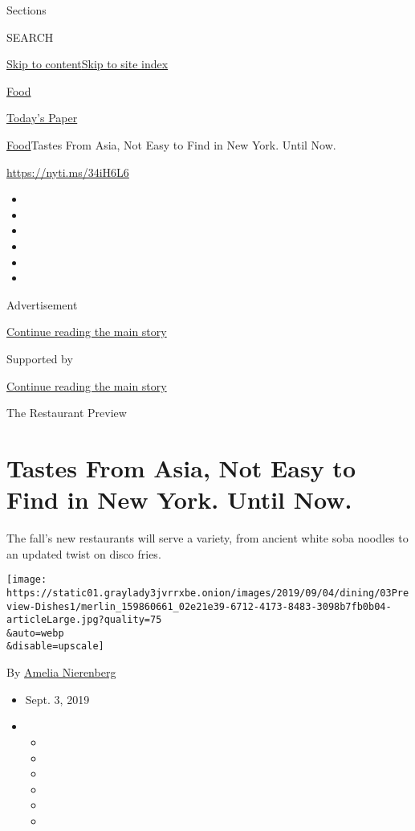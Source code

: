 Sections

SEARCH

\protect\hyperlink{site-content}{Skip to
content}\protect\hyperlink{site-index}{Skip to site index}

\href{https://www.nytimes3xbfgragh.onion/section/food}{Food}

\href{https://myaccount.nytimes3xbfgragh.onion/auth/login?response_type=cookie\&client_id=vi}{}

\href{https://www.nytimes3xbfgragh.onion/section/todayspaper}{Today's
Paper}

\href{/section/food}{Food}\textbar{}Tastes From Asia, Not Easy to Find
in New York. Until Now.

\url{https://nyti.ms/34iH6L6}

\begin{itemize}
\item
\item
\item
\item
\item
\item
\end{itemize}

Advertisement

\protect\hyperlink{after-top}{Continue reading the main story}

Supported by

\protect\hyperlink{after-sponsor}{Continue reading the main story}

The Restaurant Preview

\hypertarget{tastes-from-asia-not-easy-to-find-in-new-york-until-now}{%
\section{Tastes From Asia, Not Easy to Find in New York. Until
Now.}\label{tastes-from-asia-not-easy-to-find-in-new-york-until-now}}

The fall's new restaurants will serve a variety, from ancient white soba
noodles to an updated twist on disco fries.

\texttt{[image: https://static01.graylady3jvrrxbe.onion/images/2019/09/04/dining/03Preview-Dishes1/merlin\_159860661\_02e21e39-6712-4173-8483-3098b7fb0b04-articleLarge.jpg?quality=75\\\&auto=webp\\\&disable=upscale]}

By \href{https://www.nytimes3xbfgragh.onion/by/amelia-nierenberg}{Amelia
Nierenberg}

\begin{itemize}
\item
  Sept. 3, 2019
\item
  \begin{itemize}
  \item
  \item
  \item
  \item
  \item
  \item
  \end{itemize}
\end{itemize}

